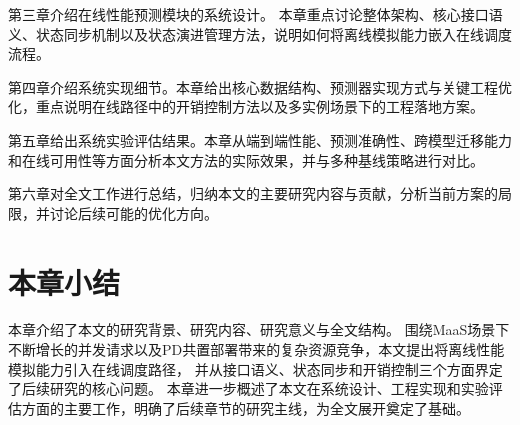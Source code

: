第三章介绍在线性能预测模块的系统设计。
本章重点讨论整体架构、核心接口语义、状态同步机制以及状态演进管理方法，说明如何将离线模拟能力嵌入在线调度流程。

第四章介绍系统实现细节。本章给出核心数据结构、预测器实现方式与关键工程优化，重点说明在线路径中的开销控制方法以及多实例场景下的工程落地方案。

第五章给出系统实验评估结果。本章从端到端性能、预测准确性、跨模型迁移能力和在线可用性等方面分析本文方法的实际效果，并与多种基线策略进行对比。

第六章对全文工作进行总结，归纳本文的主要研究内容与贡献，分析当前方案的局限，并讨论后续可能的优化方向。

\section{本章小结}
本章介绍了本文的研究背景、研究内容、研究意义与全文结构。
围绕MaaS场景下不断增长的并发请求以及PD共置部署带来的复杂资源竞争，本文提出将离线性能模拟能力引入在线调度路径，
并从接口语义、状态同步和开销控制三个方面界定了后续研究的核心问题。
本章进一步概述了本文在系统设计、工程实现和实验评估方面的主要工作，明确了后续章节的研究主线，为全文展开奠定了基础。

